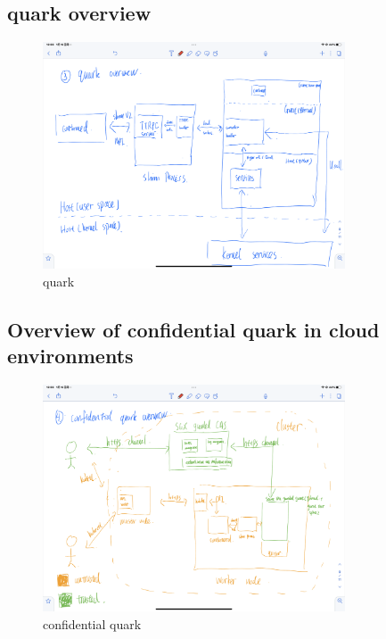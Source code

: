 \subsection{quark overview}


\begin{figure}[H]
    \centering
    \includegraphics[width=0.8\textwidth]{images/IMG_4415.PNG}
    \caption[quark]{quark}
    \label{fig:quark}
\end{figure}

\subsection{Overview of confidential quark in cloud environments}
\begin{figure}[H]
    \centering
    \includegraphics[width=0.8\textwidth]{images/IMG_4414.PNG}
    \caption[confidential quark]{confidential quark}
    \label{fig:confidential_quark}
\end{figure}



